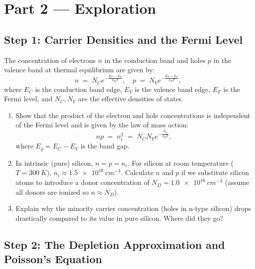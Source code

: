 \documentclass[12pt, a4paper]{book}
\begin{document}
\newpage

\section{Part 2 --- Exploration}

\subsection{Step 1: Carrier Densities and the Fermi Level}

\begin{problembox}
The concentration of electrons $n$ in the conduction band and holes $p$ in the valence band at thermal equilibrium are given by:
\[
  n \;=\; N_C e^{-\frac{E_C - E_F}{k_B T}}, \quad p \;=\; N_V e^{-\frac{E_F - E_V}{k_B T}},
\]
where $E_C$ is the conduction band edge, $E_V$ is the valence band edge, $E_F$ is the Fermi level, and $N_C, N_V$ are the effective densities of states.

\begin{enumerate}[label=(\alph*)]
  \item Show that the product of the electron and hole concentrations is independent of the Fermi level and is given by the law of mass action:
        \[
          np \;=\; n_i^2 \;=\; N_C N_V e^{-\frac{E_g}{k_B T}},
        \]
        where $E_g = E_C - E_V$ is the band gap.
  \item In intrinsic (pure) silicon, $n = p = n_i$. For silicon at room temperature ($T = \SI{300}{K}$), $n_i \approx \SI{1.5e10}{cm^{-3}}$. Calculate $n$ and $p$ if we substitute silicon atoms to introduce a donor concentration of $N_D = \SI{1.0e16}{cm^{-3}}$ (assume all donors are ionized so $n \approx N_D$).
  \item Explain why the minority carrier concentration (holes in n-type silicon) drops drastically compared to its value in pure silicon. Where did they go?
\end{enumerate}
\end{problembox}

\subsection{Step 2: The Depletion Approximation and Poisson's Equation}
\end{document}
